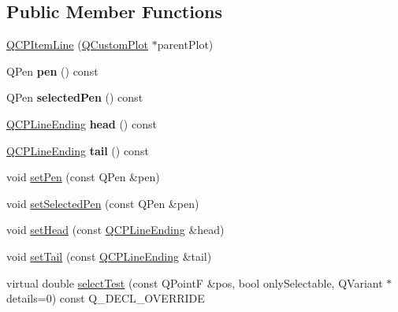 \subsection*{Public Member Functions}
\begin{DoxyCompactItemize}
\item 
\hyperlink{class_q_c_p_item_line_a17804b7f64961c6accf25b61e85142e3}{Q\+C\+P\+Item\+Line} (\hyperlink{class_q_custom_plot}{Q\+Custom\+Plot} $\ast$parent\+Plot)
\item 
\mbox{\label{class_q_c_p_item_line_a712e5a7f59db3f4c588dfc370a63e225}} 
Q\+Pen {\bfseries pen} () const
\item 
\mbox{\label{class_q_c_p_item_line_ae1782c4fbecd38054ec3d49d8572a5e5}} 
Q\+Pen {\bfseries selected\+Pen} () const
\item 
\mbox{\label{class_q_c_p_item_line_a6cdc9e87e17418d4b0e66eaa0f041407}} 
\hyperlink{class_q_c_p_line_ending}{Q\+C\+P\+Line\+Ending} {\bfseries head} () const
\item 
\mbox{\label{class_q_c_p_item_line_ac085d3939ec11d7a4d592dc2ed578360}} 
\hyperlink{class_q_c_p_line_ending}{Q\+C\+P\+Line\+Ending} {\bfseries tail} () const
\item 
void \hyperlink{class_q_c_p_item_line_a572528dab61c1abe205822fbd5db4b27}{set\+Pen} (const Q\+Pen \&pen)
\item 
void \hyperlink{class_q_c_p_item_line_a3e2fec44503277e77717e9c24f87f1ea}{set\+Selected\+Pen} (const Q\+Pen \&pen)
\item 
void \hyperlink{class_q_c_p_item_line_aebf3d687114d584e0459db6759e2c3c3}{set\+Head} (const \hyperlink{class_q_c_p_line_ending}{Q\+C\+P\+Line\+Ending} \&head)
\item 
void \hyperlink{class_q_c_p_item_line_ac264222c3297a7efe33df9345c811a5f}{set\+Tail} (const \hyperlink{class_q_c_p_line_ending}{Q\+C\+P\+Line\+Ending} \&tail)
\item 
virtual double \hyperlink{class_q_c_p_item_line_a8e02bfbca04fbcf3dbc375a2bf693229}{select\+Test} (const Q\+PointF \&pos, bool only\+Selectable, Q\+Variant $\ast$details=0) const Q\+\_\+\+D\+E\+C\+L\+\_\+\+O\+V\+E\+R\+R\+I\+DE
\item 
\mbox{\label{class_q_c_p_item_line_a17804b7f64961c6accf25b61e85142e3}} 

\end{DoxyCompactItemize}
